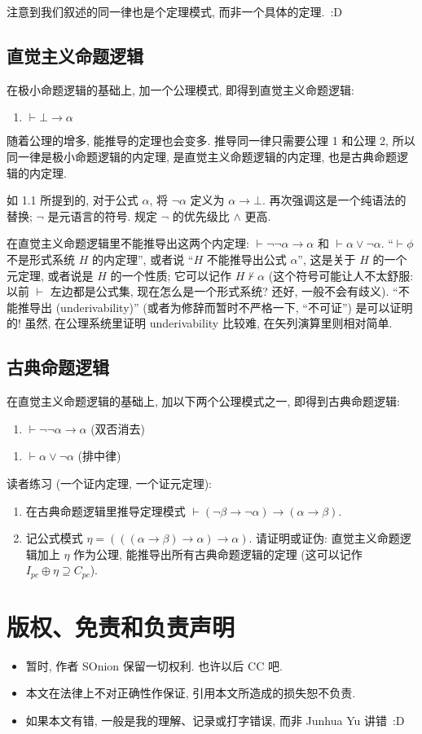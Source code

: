 \documentclass{article}
\def\a{\alpha}
\def\b{\beta}
\begin{document}
注意到我们叙述的同一律也是个定理模式, 而非一个具体的定理.~:D

\subsection{直觉主义命题逻辑}

在极小命题逻辑的基础上, 加一个公理模式, 即得到直觉主义命题逻辑:

\begin{enumerate}[start=9]
\item $\vdash \bot \to \a$
\end{enumerate}

随着公理的增多, 能推导的定理也会变多. 推导同一律只需要公理 1 和公理 2, 所以同一律是极小命题逻辑的内定理, 是直觉主义命题逻辑的内定理, 也是古典命题逻辑的内定理.

如 1.1 所提到的, 对于公式 $\a$, 将 $\neg \a$ 定义为 $\a \to \bot$. 再次强调这是一个纯语法的替换; $\neg$ 是元语言的符号. 规定 $\neg$ 的优先级比 $\land$ 更高.

在直觉主义命题逻辑里不能推导出这两个内定理: $\vdash \neg \neg \a \to \a$ 和 $\vdash \a \lor \neg \a$. ``$\vdash \phi$ 不是形式系统 $H$ 的内定理'', 或者说 ``$H$ 不能推导出公式 $\a$'', 这是关于 $H$ 的一个元定理, 或者说是 $H$ 的一个性质; 它可以记作 $H \not\vdash \a$ (这个符号可能让人不太舒服: 以前 $\vdash$ 左边都是公式集, 现在怎么是一个形式系统? 还好, 一般不会有歧义). ``不能推导出 (underivability)'' (或者为修辞而暂时不严格一下, ``不可证'') 是可以证明的! 虽然, 在公理系统里证明 underivability 比较难, 在矢列演算里则相对简单.

\subsection{古典命题逻辑}

在直觉主义命题逻辑的基础上, 加以下两个公理模式之一, 即得到古典命题逻辑:
\begin{enumerate}[start=10]
\item $\vdash \neg \neg \a \to \a$ (双否消去)
\end{enumerate}
\begin{enumerate}[start=10]
\item $\vdash \a \lor \neg \a$ (排中律)
\end{enumerate}

读者练习 (一个证内定理, 一个证元定理): 

\begin{enumerate}
\item 在古典命题逻辑里推导定理模式 $\vdash (\neg \b \to \neg \a) \to (\a \to \b)$.
\item 记公式模式 $\eta = (((\a \to \b) \to \a) \to \a)$. 请证明或证伪: 直觉主义命题逻辑加上 $\eta$ 作为公理, 能推导出所有古典命题逻辑的定理 (这可以记作 $I_{pc} \oplus \eta \supseteq C_{pc}$).
\end{enumerate}


\section{版权、免责和负责声明}
\begin{itemize}
\item 暂时, 作者 SOnion 保留一切权利. 也许以后 CC 吧.
\item 本文在法律上不对正确性作保证, 引用本文所造成的损失恕不负责.
\item 如果本文有错, 一般是我的理解、记录或打字错误, 而非 Junhua Yu 讲错~:D
\end{itemize}
\end{document}
